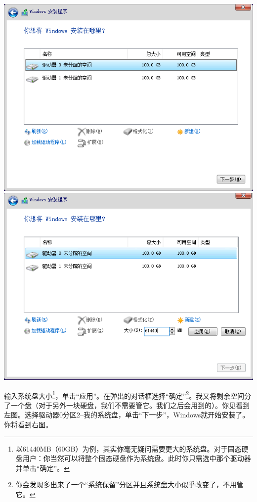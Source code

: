 \begin{center}
	\includegraphics[scale=0.45]{pic/win10setup4}	\includegraphics[scale=0.45]{pic/win10setup5}
\end{center} \par
输入系统盘大小\footnote{以61440MB（60GB）为例，其实你毫无疑问需要更大的系统盘。对于固态硬盘用户：你当然可以将整个固态硬盘作为系统盘。此时你只需选中那个驱动器并单击“确定”。}，单击“应用”。在弹出的对话框选择“确定”\footnote{你会发现多出来了一个“系统保留”分区并且系统盘大小似乎改变了，不用管它。{\color{red}{这里演示的是老型号机器：BIOS-Legacy的主板，设置使用主启动记录（MBR）的分区表格式安装。使用BIOS-UEFI安装过程大体相同，只是分区上多了“恢复”“系统分区”“MSR（保留）”“主分区”，你需要在“主分区”安装它。}}}。我又将剩余空间分了一个盘（对于另外一块硬盘，我们不需要管它。我们之后会用到的）。你见看到左图。选择驱动器0分区2--我的系统盘{\color{red}{（注意！重要！别选错了！）}}，单击“下一步”，Windows就开始安装了。你将看到右图。

